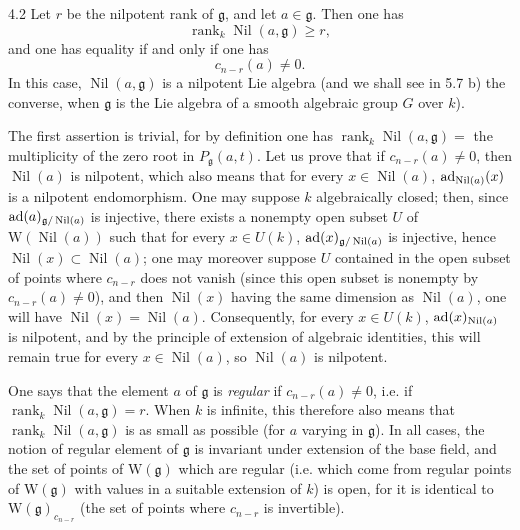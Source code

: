 \begin{proposition}{4.2}\label{XIII.4.2}
Let $r$ be the nilpotent rank of $\mathfrak g$, and let
$a\in\mathfrak g$. Then one has
\[
 \operatorname{rank}_k\operatorname{Nil}(a,\mathfrak g)\geq r,
\]
and one has equality if and only if one has
\[
 c_{n-r}(a)\ne0.
\]
In this case, $\operatorname{Nil}(a,\mathfrak g)$ is a nilpotent Lie
algebra (and we shall see in 5.7 b) the converse, when $\mathfrak g$
is the Lie algebra of a smooth algebraic group $G$ over $k$).
\end{proposition}
The first assertion is trivial, for by definition one has
$\operatorname{rank}_k\operatorname{Nil}(a,\mathfrak g)=$ the multiplicity
of the zero root in $P_{\mathfrak g}(a,t)$. Let us prove that if
$c_{n-r}(a)\ne0$, then $\operatorname{Nil}(a)$ is nilpotent, which also
means that for every $x\in\operatorname{Nil}(a)$,
$\operatorname{ad}_{\operatorname{Nil}(a)}(x)$ is a nilpotent endomorphism. One may
suppose $k$ algebraically closed; then, since
$\operatorname{ad}(a)_{\mathfrak g/\operatorname{Nil}(a)}$ is injective, there exists
a nonempty open subset $U$ of $\mathrm W(\operatorname{Nil}(a))$ such
that for every $x\in U(k)$, $\operatorname{ad}(x)_{\mathfrak g/\operatorname{Nil}(a)}$
is injective, hence $\operatorname{Nil}(x)\subset\operatorname{Nil}(a)$;
one may moreover suppose $U$ contained in the open subset of points
where $c_{n-r}$ does not vanish (since this open subset is nonempty by
$c_{n-r}(a)\ne0$), and then $\operatorname{Nil}(x)$ having the same
dimension as $\operatorname{Nil}(a)$, one will have
$\operatorname{Nil}(x)=\operatorname{Nil}(a)$. Consequently, for every
$x\in U(k)$, $\operatorname{ad}(x)_{\operatorname{Nil}(a)}$ is nilpotent, and by the
principle of extension of algebraic identities, this will remain true
for every $x\in\operatorname{Nil}(a)$, so $\operatorname{Nil}(a)$ is nilpotent.

One says that the element $a$ of $\mathfrak g$ is \emph{regular} if
$c_{n-r}(a)\ne0$, i.e. if $\operatorname{rank}_k\operatorname{Nil}(a,\mathfrak g)=r$.
When $k$ is infinite, this therefore also means that
$\operatorname{rank}_k\operatorname{Nil}(a,\mathfrak g)$ is as small
as possible (for $a$ varying in $\mathfrak g$). In all cases, the notion
of regular element of $\mathfrak g$ is invariant under extension of
the base field, and the set of points of $\mathrm W(\mathfrak g)$ which
are regular (i.e. which come from regular points of
$\mathrm W(\mathfrak g)$ with values in a suitable extension of $k$)
is open, for it is identical to $\mathrm W(\mathfrak g)_{c_{n-r}}$ (the
set of points where $c_{n-r}$ is invertible).

